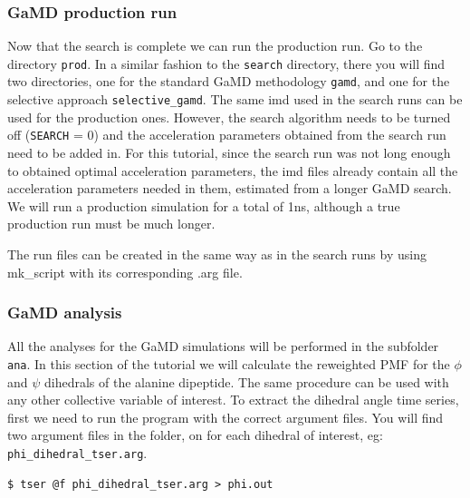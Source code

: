 \subsubsection{GaMD production run}
Now that the search is complete we can run the production run.
Go to the directory \texttt{prod}. In a similar fashion to the \texttt{search} directory, there you will find two directories, one for the standard GaMD methodology \texttt{gamd}, and one for the selective approach \texttt{selective\_gamd}. 
The same imd used in the search runs can be used for the production ones. However, the search algorithm needs to be turned off (\texttt{SEARCH} = 0) and the acceleration parameters obtained from the search run need to be added in. 
For this tutorial, since the search run was not long enough to obtained optimal acceleration parameters, the imd files already contain all the acceleration parameters needed in them, estimated from a longer GaMD search. We will run a production simulation for a total of 1ns, although a true production run must be much longer.

The run files can be created in the same way as in the search runs by using mk\_script with its corresponding .arg file.

\subsubsection{GaMD analysis}

All the analyses for the GaMD simulations will be performed in the subfolder \texttt{ana}. 
In this section of the tutorial we will calculate the reweighted PMF for the $\phi$ and $\psi$ dihedrals of the alanine dipeptide. The same procedure can be used with any other collective variable of interest.
To extract the dihedral angle time series, first we need to run the program  with the correct argument files. You will find two argument files in the folder, on for each dihedral of interest, eg: \texttt{phi\_dihedral\_tser.arg}.
 \begin{lstlisting}
$ tser @f phi_dihedral_tser.arg > phi.out
\end{lstlisting}

